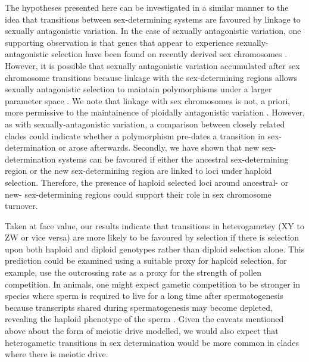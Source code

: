 \documentclass[12pt]{article}
\begin{document}
The hypotheses presented here can be investigated in a similar manner to the idea that transitions between sex-determining systems are favoured by linkage to sexually antagonistic variation. 
In the case of sexually antagonistic variation, one supporting observation is that genes that appear to experience sexually-antagonistic selection have been found on recently derived sex chromosomes \citep{Lindholm:2002dw,Tripathi:2009cw,Ser:2010iq}.
However, it is possible that sexually antagonistic variation accumulated after sex chromosome transitions because linkage with the sex-determining regions allows sexually antagonistic selection to maintain polymorphisms under a larger parameter space \citep{Rice:1987hs,Jordan:2011fj}.
We note that linkage with sex chromosomes is not, a priori, more permissive to the maintainence of ploidally antagonistic variation \citep{Immler:2012tl}.
However, as with sexually-antagonistic variation, a comparison between closely related clades could indicate whether a polymorphism pre-dates a transition in sex-determination or arose afterwards. 
Secondly, we have shown that new sex-determination systems can be favoured if either the ancestral sex-determining region or the new sex-determining region are linked to loci under haploid selection. 
Therefore, the presence of haploid selected loci around ancestral- or new- sex-determining regions could support their role in sex chromosome turnover. 

Taken at face value, our results indicate that transitions in heterogametey (XY to ZW or vice versa) are more likely to be favoured by selection if there is selection upon both haploid and diploid genotypes rather than diploid selection alone. 
This prediction could be examined using a suitable proxy for haploid selection, for example, \citep{Lenormand:2005vb} use the outcrossing rate as a proxy for the strength of pollen competition. 
In animals, one might expect gametic competition to be stronger in species where sperm is required to live for a long time after spermatogenesis because transcripts shared during spermatogenesis may become depleted, revealing the haploid phenotype of the sperm \citep{Immler:2014im}. 
Given the caveats mentioned above about the form of meiotic drive modelled, we would also expect that heterogametic transitions in sex determination would be more common in clades where there is meiotic drive. 
\end{document}
